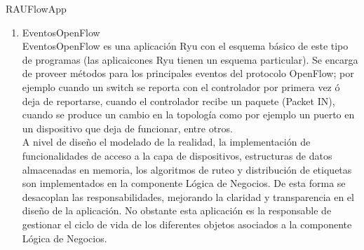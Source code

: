 \begin{subsubsection}{RAUFlowApp}





\begin{enumerate}

\item EventosOpenFlow\\
EventosOpenFlow es una aplicaci\'on Ryu con el esquema b\'asico de este tipo de programas (las aplicaicones Ryu tienen un esquema particular). Se encarga de proveer m\'etodos para los principales eventos del protocolo OpenFlow; por ejemplo cuando un switch se reporta con el controlador por primera vez \'o deja de reportarse, cuando el controlador recibe un paquete (Packet IN), cuando se produce un cambio en la topolog\'ia como por ejemplo un puerto en un dispositivo que deja de funcionar, entre otros.\\

A nivel de diseño el modelado de la realidad, la implementaci\'on de funcionalidades de acceso a la capa de dispositivos, estructuras de datos almacenadas en memoria, los algoritmos de ruteo y distribución de etiquetas son implementados en la componente Lógica de Negocios. De esta forma se desacoplan las responsabilidades, mejorando la claridad y transparencia en el diseño de la aplicaci\'on. No obstante esta aplicación es la responsable de gestionar el ciclo de vida de los diferentes objetos asociados a la componente Lógica de Negocios.
  

\end{enumerate}
\end{subsubsection}
